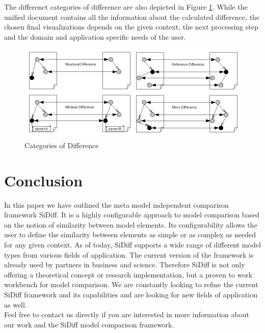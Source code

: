 \documentclass{article}
\begin{document}
The differenct categories of difference are also depicted in Figure \ref{figdiff}. While the unified document contains all the information about the calculated difference, the chosen final 
visualizations depends on the given context, the next processing step and the domain and application specific 
needs of the user. 

\begin{figure}[h]
\centering
\includegraphics{differences.png}
\caption{Categories of Difference}
\label{figdiff}
\end{figure}

\section{Conclusion}
\label{secconclusion}
In this paper we have outlined the meta model independent comparison framework SiDiff. It is a highly configurable approach to model 
comparison based on the notion of similarity between model elements. 
Its configurability allows the user to define the similarity between elements as simple or as complex 
as needed for any given context. As of today, SiDiff supports a wide range of different model types from various fields of application. 
The current version of the framework is already used by partners in business and science.  
Therefore SiDiff is not only offering a theoretical concept or research implementation, but a proven to work workbench for model 
comparison. We are constantly looking to refine the current SiDiff framework and its capabilities and are looking 
for new fields of application as well.\\  

Feel free to contact us directly if you are interested in more information about our work and the SiDiff model comparison framework. 



\end{document}
